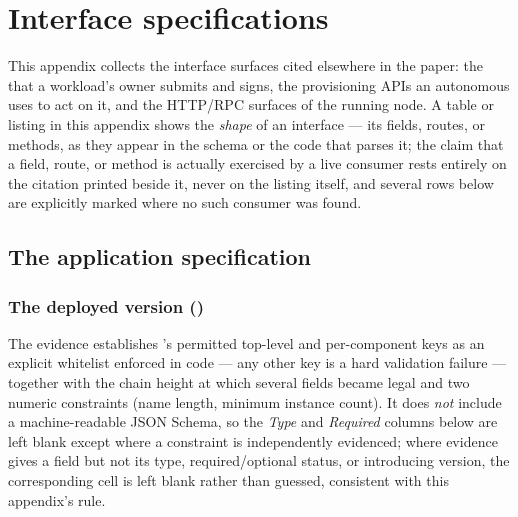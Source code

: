 \section{Interface specifications}\label{sec:app-interfaces}\label{sec:B-interfaces}

This appendix collects the interface surfaces cited elsewhere in the paper: the \appspec
that a workload's owner submits and signs, the provisioning APIs an autonomous \agent uses
to act on it, and the HTTP/RPC surfaces of the running node. A table or listing in this
appendix shows the \emph{shape} of an interface — its fields, routes, or methods, as they
appear in the schema or the code that parses it; the claim that a field, route, or method is
actually exercised by a live consumer rests entirely on the citation printed beside it, never
on the listing itself, and several rows below are explicitly marked where no such consumer was
found.

\subsection{The application specification}
\label{app:appspec}

\subsubsection{The deployed version ()}
\shipped

The evidence establishes 's permitted top-level and per-component keys as an
explicit whitelist enforced in code — any other key is a hard validation failure — together
with the chain height at which several fields became legal and two numeric constraints
(name length, minimum instance count). It does \emph{not} include a machine-readable
 JSON Schema, so the \emph{Type} and \emph{Required} columns below are left blank
except where a constraint is independently evidenced; where evidence gives a field but not
its type, required/optional status, or introducing version, the corresponding cell is left
blank rather than guessed, consistent with this appendix's rule.

